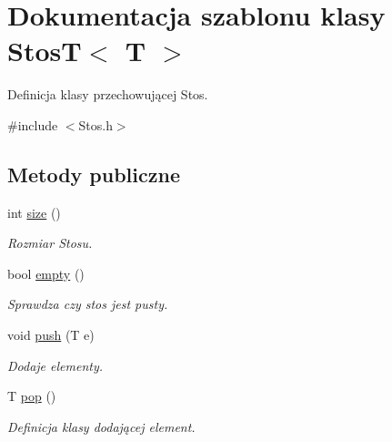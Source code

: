 \hypertarget{class_stos_t}{\section{\-Dokumentacja szablonu klasy \-Stos\-T$<$ \-T $>$}
\label{class_stos_t}
}


\-Definicja klasy przechowującej \-Stos.  




{\ttfamily \#include $<$\-Stos.\-h$>$}

\subsection*{\-Metody publiczne}
\begin{DoxyCompactItemize}
\item 
\hypertarget{class_stos_t_a5e3e0a5bb07ae2cecbff86705c6e7710}{int \hyperlink{class_stos_t_a5e3e0a5bb07ae2cecbff86705c6e7710}{size} ()}\label{class_stos_t_a5e3e0a5bb07ae2cecbff86705c6e7710}

\begin{DoxyCompactList}\small\item\em \-Rozmiar \-Stosu. \end{DoxyCompactList}\item 
\hypertarget{class_stos_t_afb1cd36b9ec9dd8c9aa5b832b09bff9e}{bool \hyperlink{class_stos_t_afb1cd36b9ec9dd8c9aa5b832b09bff9e}{empty} ()}\label{class_stos_t_afb1cd36b9ec9dd8c9aa5b832b09bff9e}

\begin{DoxyCompactList}\small\item\em \-Sprawdza czy stos jest pusty. \end{DoxyCompactList}\item 
void \hyperlink{class_stos_t_a55f36558cb39bded28a1ed3c37cbcee6}{push} (\-T e)
\begin{DoxyCompactList}\small\item\em \-Dodaje elementy. \end{DoxyCompactList}\item 
\hypertarget{class_stos_t_a3024f48043bfdbca81df37c11af4db87}{\-T \hyperlink{class_stos_t_a3024f48043bfdbca81df37c11af4db87}{pop} ()}\label{class_stos_t_a3024f48043bfdbca81df37c11af4db87}

\begin{DoxyCompactList}\small\item\em \-Definicja klasy dodającej element. \end{DoxyCompactList}\end{DoxyCompactItemize}


